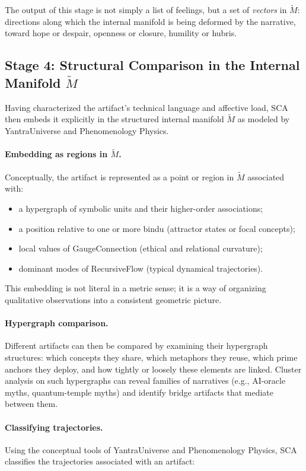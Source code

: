 \documentclass[12]{amsart}
\theoremstyle{plain}
\begin{document}
The output of this stage is not simply a list of feelings, but a set of \emph{vectors} in $\tilde M$: directions along which the internal manifold is being deformed by the narrative, toward hope or despair, openness or closure, humility or hubris.

\subsection{Stage 4: Structural Comparison in the Internal Manifold $\tilde M$}

Having characterized the artifact’s technical language and affective load, SCA then embeds it explicitly in the structured internal manifold $\tilde M$ as modeled by YantraUniverse and Phenomenology Physics.

\paragraph{Embedding as regions in $\tilde M$.} Conceptually, the artifact is represented as a point or region in $\tilde M$ associated with:

\begin{itemize}
  \item a hypergraph of symbolic units and their higher-order associations;
  \item a position relative to one or more bindu (attractor states or focal concepts);
  \item local values of GaugeConnection (ethical and relational curvature);
  \item dominant modes of RecursiveFlow (typical dynamical trajectories).
\end{itemize}

This embedding is not literal in a metric sense; it is a way of organizing qualitative observations into a consistent geometric picture.

\paragraph{Hypergraph comparison.} Different artifacts can then be compared by examining their hypergraph structures: which concepts they share, which metaphors they reuse, which prime anchors they deploy, and how tightly or loosely these elements are linked. Cluster analysis on such hypergraphs can reveal families of narratives (e.g., AI-oracle myths, quantum-temple myths) and identify bridge artifacts that mediate between them.

\paragraph{Classifying trajectories.} Using the conceptual tools of YantraUniverse and Phenomenology Physics, SCA classifies the trajectories associated with an artifact:
\end{document}
